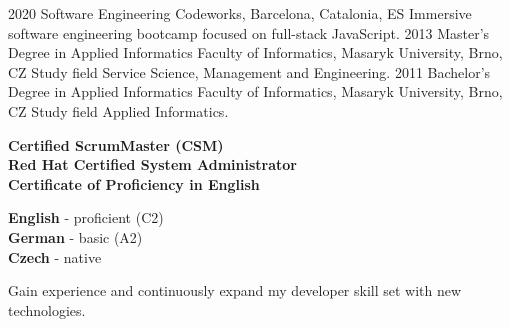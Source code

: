 \documentclass[9pt]{developercv}
\begin{document}

\begin{entrylist}
  \entry
  {2020}
  {Software Engineering}
  {Codeworks, Barcelona, Catalonia, ES}
  {Immersive software engineering bootcamp focused on full-stack JavaScript.}
  \entry
  {2013}
  {Master's Degree in Applied Informatics}
  {Faculty of Informatics, Masaryk University, Brno, CZ}
  {Study field Service Science, Management and Engineering.}
  \entry
  {2011}
  {Bachelor's Degree  in Applied Informatics}
  {Faculty of Informatics, Masaryk University, Brno, CZ}
  {Study field Applied Informatics.}
\end{entrylist}

\begin{minipage}[t]{0.35\textwidth}
  \vspace{-\baselineskip}


  \textbf{Certified ScrumMaster (CSM)}\\
  \textbf{Red Hat Certified System Administrator}\\
  \textbf{Certificate of Proficiency in English}
\end{minipage}
\hfill
\begin{minipage}[t]{0.2\textwidth}
  \vspace{-\baselineskip}


  \textbf{English} - proficient (C2)\\
  \textbf{German} - basic (A2)\\
  \textbf{Czech} - native
\end{minipage}
\hfill
\begin{minipage}[t]{0.27\textwidth}
  \vspace{-\baselineskip}


  Gain experience and continuously expand my developer skill set with new technologies.
\end{minipage}
\end{document}

